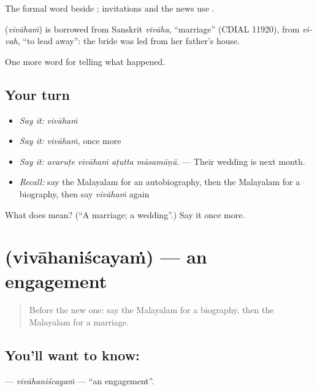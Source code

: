 The formal word beside ; invitations and the news use .

\begin{cousinweb}
\textbf{} (\emph{vivāhaṁ}) is borrowed from Sanskrit \emph{vivāha}, \textquotedblleft{}marriage\textquotedblright{} (CDIAL 11920), from \emph{vi-vah}, \textquotedblleft{}to lead away\textquotedblright{}: the bride was led from her father's house.
\end{cousinweb}

\begin{grammarlens}[title={What you've built}]
One more word for telling what happened.
\end{grammarlens}

\subsection*{Your turn}
\begin{itemize}
\raggedright
  \item \emph{Say it:} \emph{vivāhaṁ}
  \item \emph{Say it:} \emph{vivāhaṁ}, once more
  \item \emph{Say it:} \emph{avaruṭe vivāhaṁ aṭutta māsamāṇŭ.} — Their wedding is next month.
  \item \emph{Recall:} say the Malayalam for an autobiography, then the Malayalam for a biography, then say \emph{vivāhaṁ} again
\end{itemize}

\begin{tcolorbox}[breakable,colback=teal!4,colframe=teal!35!black,title={Before you move on}]
What does  mean? (\textquotedblleft{}A marriage; a wedding\textquotedblright{}.) Say it once more.
\end{tcolorbox}
\section[\texorpdfstring{\ml{വിവാഹനിശ്ചയം} (vivāhaniścayaṁ)}{വിവാഹനിശ്ചയം (vivāhaniścayaṁ)}]{ (vivāhaniścayaṁ) — an engagement}

\label{lesson:ML-C385-vivahaniscayam}



\begin{quote}
Before the new one: say the Malayalam for a biography, then the Malayalam for a marriage.
\end{quote}

\subsection*{You'll want to know: }
\textbf{} — \emph{vivāhaniścayaṁ} — \textquotedblleft{}an engagement\textquotedblright{}.

